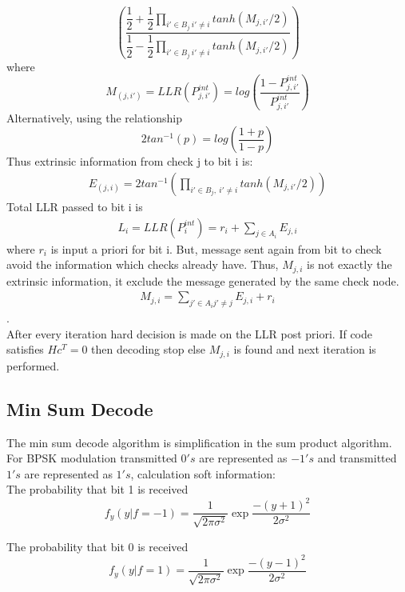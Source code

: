 \documentclass[twopage,12pt,a4paper]{report}
\begin{document}
\begin{raggedright}
\[\left(
\dfrac{\dfrac{1}{2}+\dfrac{1}{2} \prod_{i'\in B_j \ i'\neq i }tanh(M_{j,i'}/2) }{\dfrac{1}{2}-\dfrac{1}{2} \prod_{i'\in B_j \ i'\neq i }tanh(M_{j,i'}/2) } 
\right)
 \]
where 
\[ M_{(j,i')} =  LLR (P_{j,i'}^{int}) = log \left(
\dfrac{1-P_{j,i'}^{int}}{P_{j,i'}^{int}} 
\right)
\]
Alternatively, using the relationship
\[ 2tan^{-1}(p)=log \left( \dfrac{1+p}{1-p} \right) \]
Thus extrinsic information from check j to bit i is:
\begin{align} E_{(j,i)} = 2tan^{-1} \left( \prod_{i'\in B_j ,\ i'\neq i }tanh(M_{j,i'}/2) \right) \end{align}
Total LLR passed to bit i is
\begin{align} L_i = LLR(P_i^{int}) = r_i + \sum_{j\in A_i} E_{j,i} \end{align}
where $r_i$ is input a priori for bit i.
But, message sent again from bit to check avoid the information which checks already have. Thus,
$M_{j,i}$ is not exactly the extrinsic information, it exclude the message generated by the same check node.\\
\begin{align}  M_{j,i} = \sum_{j'\in A_i j'\neq j} E_{j,i} + r_i \end{align}.\\
After every iteration hard decision is made on the LLR post priori. If code satisfies $Hc^T=0$ then decoding stop else $M_{j,i}$ is found and next iteration is performed.

\subsection{Min Sum Decode}
The min sum decode algorithm is simplification in the sum product algorithm. \\
For BPSK modulation transmitted $0's$ are represented as $-1's$ and transmitted $1's$ are represented as $1's$, calculation soft information:  \\

The probability that bit 1 is received 
\[ f_y(y|f=-1) = \dfrac{1}{\sqrt{2\pi\sigma^{2}}} \exp{\dfrac{-(y+1)^2}{2\sigma^2}}
 \]
 

The probability that bit 0 is received 
\[ f_y(y|f=1) = \dfrac{1}{\sqrt{2\pi\sigma^{2}}} \exp{\dfrac{-(y-1)^2}{2\sigma^2}}
 \]
 

\end{raggedright}
\end{document}
